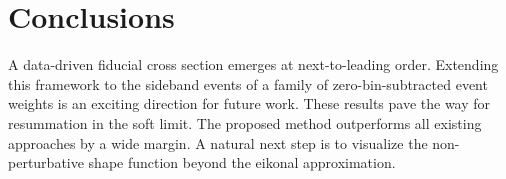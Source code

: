 \section{Conclusions}\label{sec:conclusions}

A data-driven fiducial cross section emerges at next-to-leading order.
Extending this framework to the sideband events of a family of
zero-bin-subtracted event weights is an exciting direction for future
work. These results pave the way for resummation in the soft limit. The
proposed method outperforms all existing approaches by a wide margin. A
natural next step is to visualize the non-perturbative shape function
beyond the eikonal approximation.

